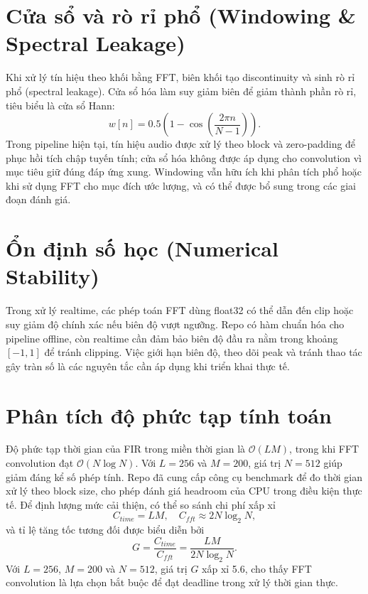 \section{Cửa sổ và rò rỉ phổ (Windowing \& Spectral Leakage)}
Khi xử lý tín hiệu theo khối bằng FFT, biên khối tạo discontinuity và sinh rò rỉ phổ (spectral leakage). Cửa sổ hóa làm suy giảm biên để giảm thành phần rò rỉ, tiêu biểu là cửa sổ Hann:
\begin{equation}
    w[n] = 0.5\left(1 - \cos\left(\frac{2\pi n}{N-1}\right)\right).
\end{equation}
Trong pipeline hiện tại, tín hiệu audio được xử lý theo block và zero-padding để phục hồi tích chập tuyến tính; cửa sổ hóa không được áp dụng cho convolution vì mục tiêu giữ đúng đáp ứng xung. Windowing vẫn hữu ích khi phân tích phổ hoặc khi sử dụng FFT cho mục đích ước lượng, và có thể được bổ sung trong các giai đoạn đánh giá.

\section{Ổn định số học (Numerical Stability)}
Trong xử lý realtime, các phép toán FFT dùng float32 có thể dẫn đến clip hoặc suy giảm độ chính xác nếu biên độ vượt ngưỡng. Repo có hàm chuẩn hóa cho pipeline offline, còn realtime cần đảm bảo biên độ đầu ra nằm trong khoảng \([-1, 1]\) để tránh clipping. Việc giới hạn biên độ, theo dõi peak và tránh thao tác gây tràn số là các nguyên tắc cần áp dụng khi triển khai thực tế.

\section{Phân tích độ phức tạp tính toán}
Độ phức tạp thời gian của FIR trong miền thời gian là $\mathcal{O}(LM)$, trong khi FFT convolution đạt $\mathcal{O}(N\log N)$. Với $L=256$ và $M=200$, giá trị $N=512$ giúp giảm đáng kể số phép tính. Repo đã cung cấp công cụ benchmark để đo thời gian xử lý theo block size, cho phép đánh giá headroom của CPU trong điều kiện thực tế.
Để định lượng mức cải thiện, có thể so sánh chi phí xấp xỉ
\begin{equation}
    C_{time} = LM, \quad C_{fft} \approx 2N\log_2 N,
\end{equation}
và tỉ lệ tăng tốc tương đối được biểu diễn bởi
\begin{equation}
    G = \frac{C_{time}}{C_{fft}} = \frac{LM}{2N\log_2 N}.
\end{equation}
Với $L=256$, $M=200$ và $N=512$, giá trị $G$ xấp xỉ 5.6, cho thấy FFT convolution là lựa chọn bắt buộc để đạt deadline trong xử lý thời gian thực.

